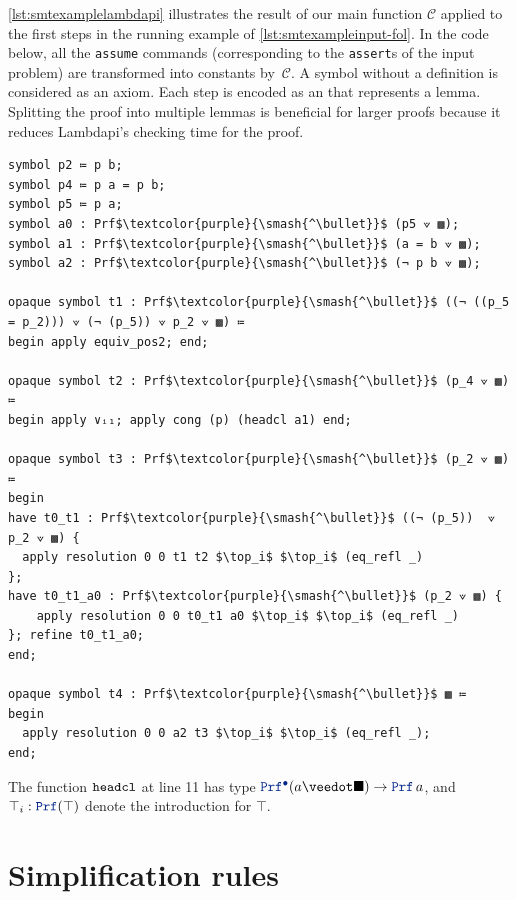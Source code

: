 \begin{example}
\cref{lst:smtexamplelambdapi} illustrates the result of our main function $\mathcal{C}$ applied to the first steps in the running example of \cref{lst:smtexampleinput-fol}.
In the code below, all the \texttt{assume} commands (corresponding to the \texttt{assert}s of the input problem) are transformed into constants by~$\mathcal{C}$. A symbol without a definition is considered as an axiom.
Each step is encoded as an  that represents a lemma. Splitting the proof into multiple lemmas is beneficial for larger proofs because it reduces Lambdapi's checking time for the proof.

\begin{lstlisting}[mathescape=true, caption={Trace from  encoded in Lambdapi.}, label={lst:smtexamplelambdapi}, language=Lambdapi]
symbol p2 ≔ p b;
symbol p4 ≔ p a = p b;
symbol p5 ≔ p a;
symbol a0 : Prf$\textcolor{purple}{\smash{^\bullet}}$ (p5 ⟇ ▩);
symbol a1 : Prf$\textcolor{purple}{\smash{^\bullet}}$ (a = b ⟇ ▩);
symbol a2 : Prf$\textcolor{purple}{\smash{^\bullet}}$ (¬ p b ⟇ ▩);

opaque symbol t1 : Prf$\textcolor{purple}{\smash{^\bullet}}$ ((¬ ((p_5 = p_2))) ⟇ (¬ (p_5)) ⟇ p_2 ⟇ ▩) ≔
begin apply equiv_pos2; end;

opaque symbol t2 : Prf$\textcolor{purple}{\smash{^\bullet}}$ (p_4 ⟇ ▩) ≔
begin apply ∨ᵢ₁; apply cong (p) (headcl a1) end;

opaque symbol t3 : Prf$\textcolor{purple}{\smash{^\bullet}}$ (p_2 ⟇ ▩) ≔
begin
have t0_t1 : Prf$\textcolor{purple}{\smash{^\bullet}}$ ((¬ (p_5))  ⟇ p_2 ⟇ ▩) {
  apply resolution 0 0 t1 t2 $\top_i$ $\top_i$ (eq_refl _)
};
have t0_t1_a0 : Prf$\textcolor{purple}{\smash{^\bullet}}$ (p_2 ⟇ ▩) {
    apply resolution 0 0 t0_t1 a0 $\top_i$ $\top_i$ (eq_refl _)
}; refine t0_t1_a0;
end;

opaque symbol t4 : Prf$\textcolor{purple}{\smash{^\bullet}}$ ▩ ≔
begin
  apply resolution 0 0 a2 t3 $\top_i$ $\top_i$ (eq_refl _);
end;
\end{lstlisting}
The function $\texttt{\upshape{headcl}}$  at line 11 has type $\prfcl (a \veedot \nil) \ra \prf\,a$, and $\top_i: \prf (\top)$ denote the introduction for $\top$.
\end{example}

\section{Simplification rules}

